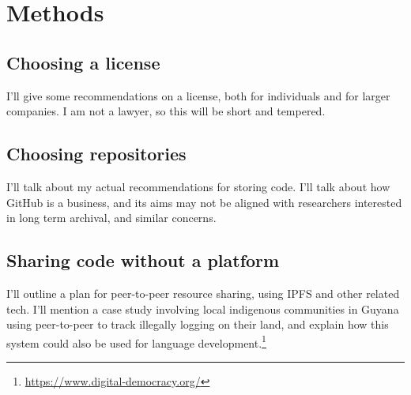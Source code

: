 \section{Methods}
\label{sec:methods}

\subsection{Choosing a license}
\label{choosing-a-license}

I'll give some recommendations on a license, both for individuals and for larger companies. I am not a lawyer, so this will be short and tempered.

\subsection{Choosing repositories}
\label{choosing-repositories}

I'll talk about my actual recommendations for storing code. I'll talk about how GitHub is a business, and its aims may not be aligned with researchers interested in long term archival, and similar concerns.


\subsection{Sharing code without a platform}
\label{subsec:sharing-code-without-a-platform}

I'll outline a plan for peer-to-peer resource sharing, using IPFS \citep{benet2014ipfs} and other related tech. I'll mention a case study involving local indigenous communities in Guyana using peer-to-peer to track illegally logging on their land, and explain how this system could also be used for language development.\footnote{\href{https://www.digital-democracy.org/}{https://www.digital-democracy.org/}}
